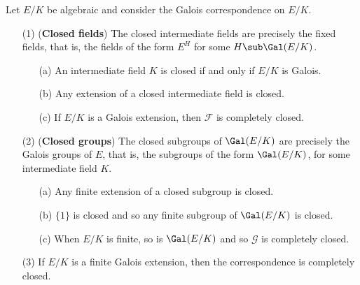 \begin{theorem}\label{Galois fundamental theorem-2}
Let $E/K$ be algebraic and consider the Galois correspondence on $E/K$.
\begin{itemize}
\item[(1)] (\textbf{Closed fields}) The closed intermediate fields are precisely the fixed fields, that is, the fields of the form $E^H$ for some $H\sub\Gal(E/K)$.
\begin{itemize}
\item[(a)] An intermediate field $K$ is closed if and only if $E/K$ is Galois.
\item[(b)] Any extension of a closed intermediate field is closed.
\item[(c)] If $E/K$ is a Galois extension, then $\mathcal{F}$ is completely closed. 
\end{itemize} 
\item[(2)] (\textbf{Closed groups}) The closed subgroups of $\Gal(E/K)$ are precisely the Galois groups of $E$, that is, the subgroups of the form $\Gal(E/K)$, for some intermediate field $K$.
\begin{itemize}
\item[(a)] Any finite extension of a closed subgroup is closed.
\item[(b)] $\{1\}$ is closed and so any finite subgroup of $\Gal(E/K)$ is closed.
\item[(c)] When $E/K$ is finite, so is $\Gal(E/K)$ and so $\mathcal{G}$ is completely closed.
\end{itemize}  
\item[(3)] If $E/K$ is a finite Galois extension, then the correspondence is completely closed.
\end{itemize}
\end{theorem}
